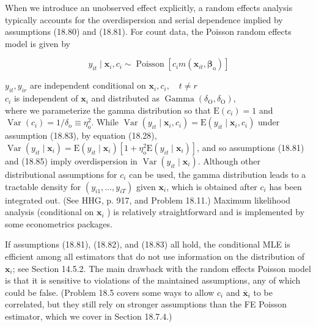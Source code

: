 \documentclass[10pt]{article}
\begin{document}
When we introduce an unobserved effect explicitly, a random effects analysis typically accounts for the overdispersion and serial dependence implied by assumptions (18.80) and (18.81). For count data, the Poisson random effects model is given by


\begin{equation*}
y_{i t} \mid \mathbf{x}_{i}, c_{i} \sim \operatorname{Poisson}\left[c_{i} m\left(\mathbf{x}_{i t}, \boldsymbol{\beta}_{\mathrm{o}}\right)\right] \tag{18.83}
\end{equation*}


$y_{i t}, y_{i r}$ are independent conditional on $\mathbf{x}_{i}, c_{i}, \quad t \neq r$\\
$c_{i}$ is independent of $\mathbf{x}_{i}$ and distributed as $\operatorname{Gamma}\left(\delta_{\mathrm{O}}, \delta_{\mathrm{O}}\right)$,\\
where we parameterize the gamma distribution so that $\mathrm{E}\left(c_{i}\right)=1$ and $\operatorname{Var}\left(c_{i}\right)= 1 / \delta_{\mathrm{o}} \equiv \eta_{\mathrm{o}}^{2}$. While $\operatorname{Var}\left(y_{i t} \mid \mathbf{x}_{i}, c_{i}\right)=\mathrm{E}\left(y_{i t} \mid \mathbf{x}_{i}, c_{i}\right)$ under assumption (18.83), by equation (18.28), $\operatorname{Var}\left(y_{i t} \mid \mathbf{x}_{i}\right)=\mathrm{E}\left(y_{i t} \mid \mathbf{x}_{i}\right)\left[1+\eta_{\mathrm{o}}^{2} \mathrm{E}\left(y_{i t} \mid \mathbf{x}_{i}\right)\right]$, and so assumptions (18.81) and (18.85) imply overdispersion in $\operatorname{Var}\left(y_{i t} \mid \mathbf{x}_{i}\right)$. Although other distributional assumptions for $c_{i}$ can be used, the gamma distribution leads to a tractable density for $\left(y_{i 1}, \ldots, y_{i T}\right)$ given $\mathbf{x}_{i}$, which is obtained after $c_{i}$ has been integrated out. (See HHG, p. 917, and Problem 18.11.) Maximum likelihood analysis (conditional on $\mathbf{x}_{i}$ ) is relatively straightforward and is implemented by some econometrics packages.

If assumptions (18.81), (18.82), and (18.83) all hold, the conditional MLE is efficient among all estimators that do not use information on the distribution of $\mathbf{x}_{i}$; see Section 14.5.2. The main drawback with the random effects Poisson model is that it is sensitive to violations of the maintained assumptions, any of which could be false. (Problem 18.5 covers some ways to allow $c_{i}$ and $\overline{\mathbf{x}}_{i}$ to be correlated, but they still rely on stronger assumptions than the FE Poisson estimator, which we cover in Section 18.7.4.)
\end{document}
